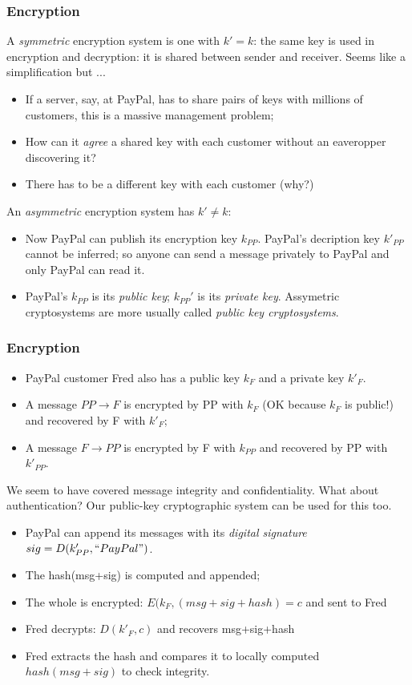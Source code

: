 \documentclass[10pt, hyperref={pdfpagelabels=false}]{beamer}
\begin{document}
\begin{frame}
\frametitle{Encryption}
A \emph{\color{blue}symmetric} encryption system is one with $k' = k$: the same key is used in encryption and decryption: it is shared between sender and receiver. Seems like a simplification but ...
\begin{itemize}
\item If a server, say, at PayPal, has to share pairs of keys with millions of customers, this is a massive management problem;
\item How can it \emph{agree} a shared key with each customer without an eaveropper discovering it?
\item There has to be a different key with each customer (why?)
\end{itemize}

An \emph{\color{blue}asymmetric} encryption system has $k' \ne k$:
\begin{itemize}
\item Now PayPal can publish its encryption key $k_{PP}$. PayPal's decription key $k'_{PP}$ cannot be inferred; so anyone can send a message privately to PayPal and only PayPal can read it.
\item PayPal's $k_{PP}$ is its \emph{\color{blue}public key}; $k_{PP}'$ is its \emph{\color{blue}private key}. Assymetric cryptosystems are more usually called \emph{\color{blue}public key cryptosystems}.   
\end{itemize}
\end{frame}

\begin{frame}
\frametitle{Encryption}
\begin{itemize}
\item PayPal customer Fred also has a public key $k_F$ and a private key $k'_F$.
\item A message $PP \rightarrow F$ is encrypted by PP with $k_F$ (OK because $k_F$ is public!) and recovered by F with $k'_F$; 
\item A message $F \rightarrow PP$ is encrypted by F with $k_{PP}$ and recovered by PP with $k'_{PP}$.
\end{itemize}

We seem to have covered message integrity and confidentiality. What about authentication? Our public-key cryptographic system can be used for this too.
\begin{itemize}
\item PayPal can append its messages with its \emph{\color{blue}digital signature} $sig = D(k'_{PP},``PayPal")$.
\item The hash(msg+sig) is computed and appended;
\item The whole is encrypted: $E(k_F, (msg+sig+hash) = c$ and sent to Fred
\item Fred decrypts: $D(k'_F,c)$ and recovers msg+sig+hash
\item Fred extracts the hash and compares it to locally computed $hash(msg+sig)$ to check integrity.
\end{itemize}
\end{frame}
\end{document}

